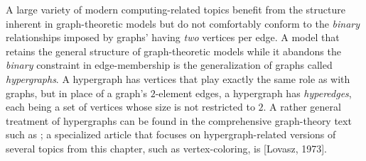 \bigskip

\noindent
A large variety of modern computing-related topics benefit from the structure inherent in graph-theoretic models but do not comfortably conform to the {\em binary} relationships imposed by graphs' having {\em two} vertices per edge.  A model that retains the general structure of graph-theoretic models while it abandons the {\em binary} constraint in edge-membership is the generalization of graphs called {\em hypergraphs}.  A hypergraph has vertices that play exactly the same role as with graphs, but in place of a graph's $2$-element edges, a hypergraph has {\em hyperedges}, each being a set of vertices whose size is not restricted to $2$.  A rather general treatment of hypergraphs can be found in the comprehensive graph-theory text such as \cite{Berge73}; a specialized article that focuses on hypergraph-related versions of several topics from this chapter, such as vertex-coloring, is [Lovasz, 1973].

\smallskip

